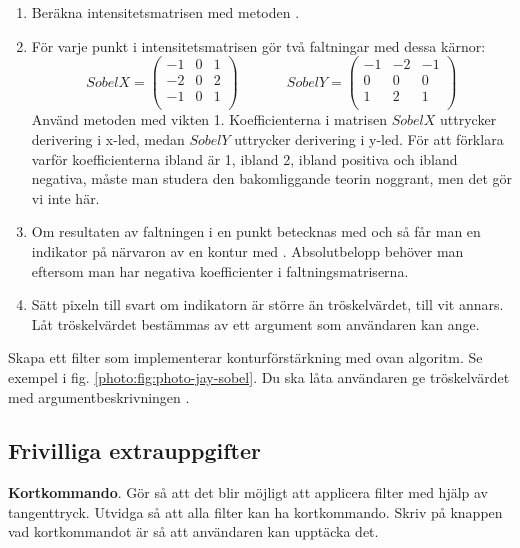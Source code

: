 \begin{enumerate}
	\item Beräkna intensitetsmatrisen med metoden .
	\item För varje punkt i intensitetsmatrisen gör två faltningar med dessa kärnor:
$$
SobelX =
\begin{pmatrix}
  -1 & 0 & 1 \\
  -2 & 0 & 2 \\
  -1 & 0 & 1 \\
\end{pmatrix}
~\hspace{3em}~
SobelY =
\begin{pmatrix}
  -1 & -2 & -1 \\
  0 & 0 & 0 \\
  1 & 2 & 1 \\
\end{pmatrix}
$$
	Använd metoden  med vikten 1. Koefficienterna i matrisen $SobelX$ uttrycker derivering i x-led, medan $SobelY$ uttrycker derivering i y-led. För att förklara varför koefficienterna ibland är 1, ibland 2, ibland positiva och ibland negativa, måste man studera den bakomliggande teorin noggrant, men det gör vi inte här.
	\item Om resultaten av faltningen i en punkt betecknas med  och  så får man en indikator på närvaron av en kontur med . Absolutbelopp behöver man eftersom man har negativa koefficienter i faltningsmatriserna.
	\item  Sätt pixeln till svart om indikatorn är större än tröskelvärdet, till vit annars. Låt tröskelvärdet bestämmas av ett argument som användaren kan ange.
\end{enumerate}
\noindent Skapa ett filter  som implementerar konturförstärkning med ovan algoritm. Se exempel i fig. \ref{photo:fig:photo-jay-sobel}. Du ska låta användaren ge tröskelvärdet med argumentbeskrivningen .


\Task 

\subsection{Frivilliga extrauppgifter}

\Task \textbf{Kortkommando}. Gör så att det blir möjligt att applicera filter med hjälp av tangenttryck. Utvidga  så att alla filter kan ha kortkommando. Skriv på knappen vad kortkommandot är så att användaren kan upptäcka det.

